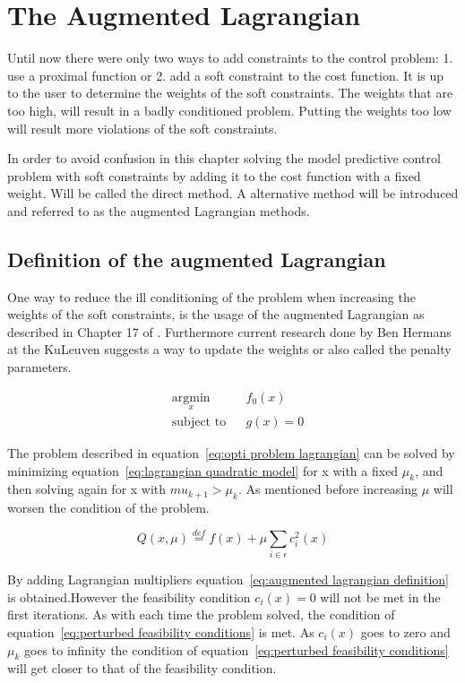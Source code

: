 \chapter{The Augmented Lagrangian}
Until now there were only two ways to add constraints to the control problem: 1. use a proximal function or 2. add a soft constraint to the cost function. It is up to the user to determine the weights of the soft constraints. The weights that are too high, will result in a badly conditioned problem. Putting the weights too low will result more violations of the soft constraints.

In order to avoid confusion in this chapter solving the model predictive control problem with soft constraints by adding it to the cost function with a fixed weight. Will be called the direct method. A alternative method will be introduced and referred to as the augmented Lagrangian methods.

\section{Definition of the augmented Lagrangian}
	One way to reduce the ill conditioning of the problem when increasing the weights of the soft constraints, is the usage of the augmented Lagrangian as described in Chapter 17 of \cite{Wright}. Furthermore current research done by Ben Hermans at the KuLeuven suggests a way to update the weights or also called the penalty parameters.
	
	\begin{equation}
		\begin{aligned}
			& \underset{x}{\text{argmin}}
			& & f_0(x) \\
			& \text{subject to}
			& & g(x)=0
		\end{aligned}
		\label{eq:opti problem lagrangian}
	\end{equation}
	
	The problem described in equation~\ref{eq:opti problem lagrangian} can be solved by minimizing equation~\ref{eq:lagrangian quadratic model}  for x with a fixed $\mu_k$, and then solving again for x with $mu_{k+1}>\mu_k $. As mentioned before increasing $\mu$ will worsen the condition of the problem. 
	
	\begin{equation}
		Q(x,\mu) \overset{def}{=} f(x) + \mu \sum_{i \in \epsilon} c_i^2(x)
		\label{eq:lagrangian quadratic model}
	\end{equation}
	
	By adding Lagrangian multipliers equation~\ref{eq:augmented lagrangian definition} is obtained.However the feasibility condition $c_i(x)=0$ will not be met in the first iterations. As with each time the problem solved, the condition of equation~\ref{eq:perturbed feasibility conditions} is met. As $c_i(x)$ goes to zero and $\mu_k$ goes to infinity the condition of equation~\ref{eq:perturbed feasibility conditions} will get closer to that of the feasibility condition.
	
